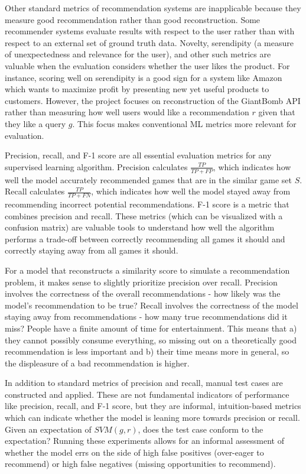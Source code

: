 \documentclass[10pt,twocolumn]{article}
\begin{document}
Other standard metrics of recommendation systems are inapplicable because they measure good recommendation rather than good reconstruction. Some recommender systems evaluate results with respect to the user rather than with respect to an external set of ground truth data. Novelty, serendipity (a measure of unexpectedness and relevance for the user), and other such metrics are valuable when the evaluation considers whether the user likes the product. \cite{Cremonesi} For instance, scoring well on serendipity is a good sign for a system like Amazon \cite{AmazonRS} which wants to maximize profit by presenting new yet useful products to customers. However, the project focuses on reconstruction of the GiantBomb API rather than measuring how well users would like a recommendation $r$ given that they like a query $g$. This focus makes conventional ML metrics more relevant for evaluation.

Precision, recall, and F-1 score are all essential evaluation metrics for any supervised learning algorithm. \cite{NAlAzzam, Chowdhury, Sujatha} Precision calculates $\frac{TP}{TP + FP}$, which indicates how well the model accurately recommended games that are in the similar game set $S$. Recall calculates $\frac{TP}{TP + FN}$, which indicates how well the model stayed away from recommending incorrect potential recommendations. F-1 score is a metric that combines precision and recall. These metrics (which can be visualized with a confusion matrix) are valuable tools to understand how well the algorithm performs a trade-off between correctly recommending all games it should and correctly staying away from all games it should.

For a model that reconstructs a similarity score to simulate a recommendation problem, it makes sense to slightly prioritize precision over recall. Precision involves the correctness of the overall recommendations - how likely was the model's recommendation to be true? Recall involves the correctness of the model staying away from recommendations - how many true recommendations did it miss? People have a finite amount of time for entertainment. This means that a) they cannot possibly consume everything, so missing out on a theoretically good recommendation is less important and b) their time means more in general, so the displeasure of a bad recommendation is higher. 

In addition to standard metrics of precision and recall, manual test cases are constructed and applied. These are not fundamental indicators of performance like precision, recall, and F-1 score, but they are informal, intuition-based metrics which can indicate whether the model is leaning more towards precision or recall. Given an expectation of $SVM(g, r)$, does the test case conform to the expectation? Running these experiments allows for an informal assessment of whether the model errs on the side of high false positives (over-eager to recommend) or high false negatives (missing opportunities to recommend).
\end{document}

